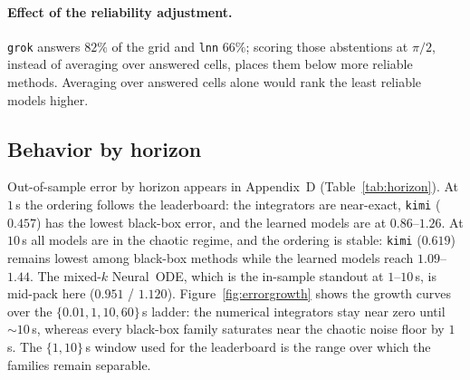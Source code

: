 \documentclass{article}
\begin{document}
\paragraph{Effect of the reliability adjustment.} \texttt{grok} answers $82\%$ of the grid
and \texttt{lnn} $66\%$; scoring those abstentions at $\pi/2$, instead of averaging over
answered cells, places them below more reliable methods. Averaging over answered cells alone would
rank the least reliable models higher.

\subsection{Behavior by horizon}
\label{sec:behavior}
Out-of-sample error by horizon appears in Appendix~D (Table~\ref{tab:horizon}). At $1$\,s the ordering
follows the leaderboard: the integrators are near-exact, \texttt{kimi} ($0.457$) has the
lowest black-box error, and the learned models are at $0.86$--$1.26$. At $10$\,s all models
are in the chaotic regime, and the ordering is stable: \texttt{kimi} ($0.619$) remains lowest
among black-box methods while the learned models reach $1.09$--$1.44$. The mixed-$k$
Neural~ODE, which is the in-sample standout at $1$--$10$\,s, is mid-pack here ($0.951$ /
$1.120$). Figure~\ref{fig:errorgrowth} shows the growth curves over the
$\{0.01,1,10,60\}$\,s ladder: the numerical integrators stay near zero until ${\sim}10$\,s,
whereas every black-box family saturates near the chaotic noise floor by $1$\,s. The
$\{1,10\}$\,s window used for the leaderboard is the range over which the families remain
separable.

\end{document}
